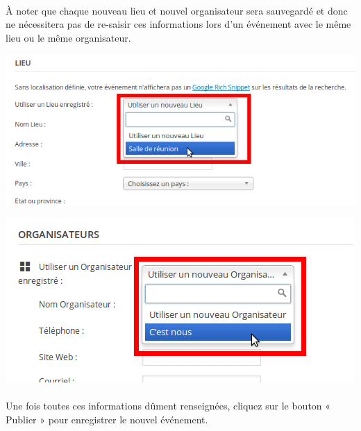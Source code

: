\documentclass[10pt,a4paper]{article}
\begin{document}
\paragraph{}À noter que chaque nouveau lieu et nouvel organisateur sera sauvegardé et donc ne nécessitera pas de re-saisir ces informations lors d'un événement avec le même lieu ou le même organisateur.
\begin{center}
\includegraphics[scale=0.3]{img/0200.png}
\end{center}
\begin{center}
\includegraphics[scale=0.3]{img/0201.png}
\end{center}
\paragraph{}Une fois toutes ces informations dûment renseignées, cliquez sur le bouton « Publier » pour enregistrer le nouvel événement.
\end{document}
